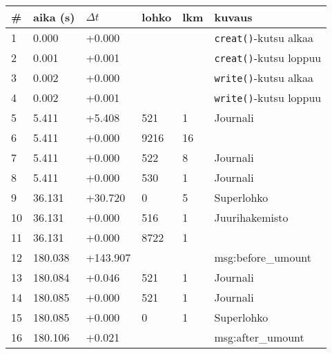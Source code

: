 \begin{table}[H]
\begin{tabular}{l | l | l | l | l | p{7cm}}
    \# & aika (s) & $\Delta t$ & lohko & lkm & kuvaus \\ \hline \hline
    1  & 0.000    & +0.000   &      &      & \texttt{creat()}-kutsu alkaa   \\ \hline %
    2  & 0.001    & +0.001   &      &      & \texttt{creat()}-kutsu loppuu  \\ \hline %
    3  & 0.002    & +0.000   &      &      & \texttt{write()}-kutsu alkaa   \\ \hline %
    4  & 0.002    & +0.001   &      &      & \texttt{write()}-kutsu loppuu  \\ \hline %
    5  & 5.411    & +5.408   & 521  & 1    & Journali                       \\ \hline %
    6  & 5.411    & +0.000   & 9216 & 16   &                                \\ \hline %
    7  & 5.411    & +0.000   & 522  & 8    & Journali                       \\ \hline %
    8  & 5.411    & +0.000   & 530  & 1    & Journali                       \\ \hline %
    9  & 36.131   & +30.720  & 0    & 5    & Superlohko                     \\ \hline %
    10 & 36.131   & +0.000   & 516  & 1    & Juurihakemisto                 \\ \hline %
    11 & 36.131   & +0.000   & 8722 & 1    &                                \\ \hline %
    12 & 180.038  & +143.907 &      &      & msg:before\_umount             \\ \hline %
    13 & 180.084  & +0.046   & 521  & 1    & Journali                       \\ \hline %
    14 & 180.085  & +0.000   & 521  & 1    & Journali                       \\ \hline %
    15 & 180.085  & +0.000   & 0    & 1    & Superlohko                     \\ \hline %
    16 & 180.106  & +0.021   &      &      & msg:after\_umount              \\ \hline %
\end{tabular}
\end{table}

